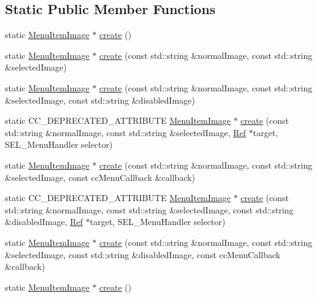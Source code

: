\subsection*{Static Public Member Functions}
\begin{DoxyCompactItemize}
\item 
static \hyperlink{classMenuItemImage}{Menu\+Item\+Image} $\ast$ \hyperlink{classMenuItemImage_a37bdd75572fd67b62ec0220901f477e5}{create} ()
\item 
static \hyperlink{classMenuItemImage}{Menu\+Item\+Image} $\ast$ \hyperlink{classMenuItemImage_a0533ff2bb569d96e45dd25fc246a7bae}{create} (const std\+::string \&normal\+Image, const std\+::string \&selected\+Image)
\item 
static \hyperlink{classMenuItemImage}{Menu\+Item\+Image} $\ast$ \hyperlink{classMenuItemImage_ab7a90cd28f289a7faafd9d1c7b37e78d}{create} (const std\+::string \&normal\+Image, const std\+::string \&selected\+Image, const std\+::string \&disabled\+Image)
\item 
static C\+C\+\_\+\+D\+E\+P\+R\+E\+C\+A\+T\+E\+D\+\_\+\+A\+T\+T\+R\+I\+B\+U\+TE \hyperlink{classMenuItemImage}{Menu\+Item\+Image} $\ast$ \hyperlink{classMenuItemImage_ae36d584792a616fce4093b8f089aff6e}{create} (const std\+::string \&normal\+Image, const std\+::string \&selected\+Image, \hyperlink{classRef}{Ref} $\ast$target, S\+E\+L\+\_\+\+Menu\+Handler selector)
\item 
static \hyperlink{classMenuItemImage}{Menu\+Item\+Image} $\ast$ \hyperlink{classMenuItemImage_a802e4337cf147e4086a8c45c0a7b8091}{create} (const std\+::string \&normal\+Image, const std\+::string \&selected\+Image, const cc\+Menu\+Callback \&callback)
\item 
static C\+C\+\_\+\+D\+E\+P\+R\+E\+C\+A\+T\+E\+D\+\_\+\+A\+T\+T\+R\+I\+B\+U\+TE \hyperlink{classMenuItemImage}{Menu\+Item\+Image} $\ast$ \hyperlink{classMenuItemImage_a3fcb8eed93782b2888c6f02d226164b5}{create} (const std\+::string \&normal\+Image, const std\+::string \&selected\+Image, const std\+::string \&disabled\+Image, \hyperlink{classRef}{Ref} $\ast$target, S\+E\+L\+\_\+\+Menu\+Handler selector)
\item 
static \hyperlink{classMenuItemImage}{Menu\+Item\+Image} $\ast$ \hyperlink{classMenuItemImage_a3b77e01f2a8d9214797be3bfd6597a25}{create} (const std\+::string \&normal\+Image, const std\+::string \&selected\+Image, const std\+::string \&disabled\+Image, const cc\+Menu\+Callback \&callback)
\item 
static \hyperlink{classMenuItemImage}{Menu\+Item\+Image} $\ast$ \hyperlink{classMenuItemImage_a27c985ee5c0982b105052a3ff49e5f61}{create} ()

\end{DoxyCompactItemize}
